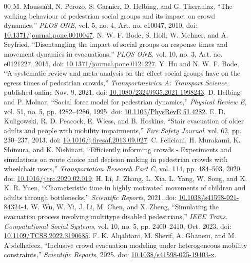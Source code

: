 \documentclass[conference]{IEEEtran}
\begin{document}
\begin{thebibliography}{00}
 M. Moussa\"id, N. Perozo, S. Garnier, D. Helbing, and G. Theraulaz, ``The walking behaviour of pedestrian social groups and its impact on crowd dynamics,'' \emph{PLOS ONE}, vol. 5, no. 4, Art. no. e10047, 2010, doi: \href{https://doi.org/10.1371/journal.pone.0010047}{10.1371/journal.pone.0010047}.
 N. W. F. Bode, S. Holl, W. Mehner, and A. Seyfried, ``Disentangling the impact of social groups on response times and movement dynamics in evacuations,'' \emph{PLOS ONE}, vol. 10, no. 3, Art. no. e0121227, 2015, doi: \href{https://doi.org/10.1371/journal.pone.0121227}{10.1371/journal.pone.0121227}.
 Y. Hu and N. W. F. Bode, ``A systematic review and meta-analysis on the effect social groups have on the egress times of pedestrian crowds,'' \emph{Transportmetrica A: Transport Science}, published online Nov. 9, 2021. doi: \href{https://doi.org/10.1080/23249935.2021.1998243}{10.1080/23249935.2021.1998243}.
 D. Helbing and P. Molnar, ``Social force model for pedestrian dynamics,'' \emph{Physical Review E}, vol. 51, no. 5, pp. 4282--4286, 1995. doi: \href{https://doi.org/10.1103/PhysRevE.51.4282}{10.1103/PhysRevE.51.4282}.
 E. D. Kuligowski, R. D. Peacock, E. Wiess, and B. Hoskins, ``Stair evacuation of older adults and people with mobility impairments,'' \emph{Fire Safety Journal}, vol. 62, pp. 230--237, 2013. doi: \href{https://doi.org/10.1016/j.firesaf.2013.09.027}{10.1016/j.firesaf.2013.09.027}.
 C. Feliciani, H. Murakami, K. Shimura, and K. Nishinari, ``Efficiently informing crowds - Experiments and simulations on route choice and decision making in pedestrian crowds with wheelchair users,'' \emph{Transportation Research Part C}, vol. 114, pp. 484--503, 2020. doi: \href{https://doi.org/10.1016/j.trc.2020.02.019}{10.1016/j.trc.2020.02.019}.
 H. Li, J. Zhang, L. Xia, L. Yang, W. Song, and K. K. R. Yuen, ``Characteristic time in highly motivated movements of children and adults through bottlenecks,'' \emph{Scientific Reports}, 2021. doi: \href{https://doi.org/10.1038/s41598-021-84324-4}{10.1038/s41598-021-84324-4}.
 W. Wu, W. Yi, J. Li, M. Chen, and X. Zheng, ``Simulating the evacuation process involving multitype disabled pedestrians,'' \emph{IEEE Trans. Computational Social Systems}, vol. 10, no. 5, pp. 2400--2410, Oct. 2023, doi: \href{https://doi.org/10.1109/TCSS.2022.3190685}{10.1109/TCSS.2022.3190685}.
 F. K. Alqahtani, M. Sherif, A. Ghanem, and M. Abdelhafeez, ``Inclusive crowd evacuation modeling under heterogeneous mobility constraints,'' \emph{Scientific Reports}, 2025. doi: \href{https://doi.org/10.1038/s41598-025-19403-x}{10.1038/s41598-025-19403-x}.

\end{thebibliography}
\end{document}
